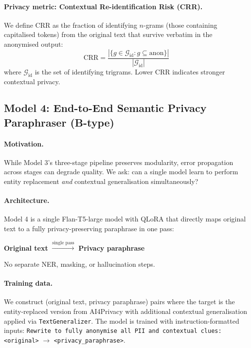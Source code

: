 \documentclass[11pt,a4paper]{article}
\begin{document}
\paragraph{Privacy metric: Contextual Re-identification Risk (CRR).}
We define CRR as the fraction of identifying $n$-grams (those containing
capitalised tokens) from the original text that survive verbatim in the
anonymised output:
\begin{equation}
    \text{CRR} = \frac{|\{g \in \mathcal{G}_{\text{id}} : g \subseteq \text{anon}\}|}{|\mathcal{G}_{\text{id}}|}
\end{equation}
where $\mathcal{G}_{\text{id}}$ is the set of identifying trigrams.  Lower CRR
indicates stronger contextual privacy.

\subsection{Model 4: End-to-End Semantic Privacy Paraphraser (B-type)}
\label{sec:semantic}

\paragraph{Motivation.}
While Model 3's three-stage pipeline preserves modularity, error propagation
across stages can degrade quality.  We ask: can a single model learn to
perform entity replacement \emph{and} contextual generalisation simultaneously?

\paragraph{Architecture.}
Model 4 is a single Flan-T5-large model with QLoRA that directly maps original
text to a fully privacy-preserving paraphrase in one pass:
\begin{center}
\small
\textbf{Original text} $\xrightarrow{\text{single pass}}$ \textbf{Privacy paraphrase}
\end{center}
No separate NER, masking, or hallucination steps.

\paragraph{Training data.}
We construct (original text, privacy paraphrase) pairs where the target is
the entity-replaced version from AI4Privacy with additional contextual
generalisation applied via \texttt{TextGeneralizer}.  The model is trained with
instruction-formatted inputs:
\texttt{Rewrite to fully anonymise all PII and contextual clues: <original>}
$\rightarrow$ \texttt{<privacy\_paraphrase>}.
\end{document}
